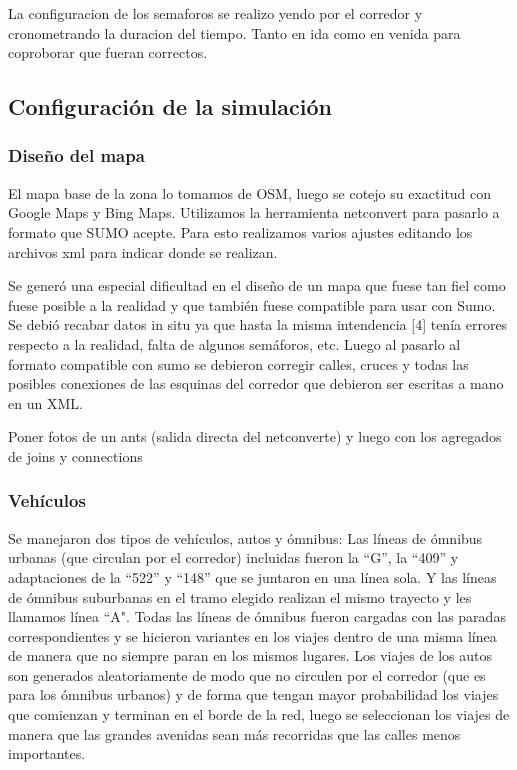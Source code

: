 La configuracion de los semaforos se realizo yendo por el corredor y cronometrando la duracion del tiempo. Tanto en ida como en venida para coproborar que fueran correctos.



\subsection{Configuración de la simulación}

\subsubsection{Diseño del mapa}
El mapa base de la zona lo tomamos de OSM, luego se cotejo su exactitud con Google Maps y Bing Maps.
Utilizamos la herramienta netconvert para pasarlo a formato que SUMO acepte. 
Para esto realizamos varios ajustes editando los archivos xml para indicar donde se realizan.

Se generó una especial dificultad en el diseño de un mapa que
fuese tan fiel como fuese posible a la realidad y que también
fuese compatible para usar con  Sumo. Se debió recabar datos
in  situ  ya  que  hasta  la  misma  intendencia  [4]  tenía  errores
respecto a la realidad, falta de algunos semáforos, etc. Luego al
pasarlo  al  formato  compatible  con  sumo  se  debieron  corregir
calles,  cruces  y  todas las  posibles  conexiones de  las  esquinas
del corredor que debieron ser escritas a mano en un XML.

Poner fotos de un ants (salida directa del netconverte) y luego con los agregados de joins y connections


\subsubsection{Vehículos}
Se manejaron dos tipos de vehículos, autos y ómnibus:
Las  líneas  de  ómnibus  urbanas  (que  circulan  por  el
corredor)  incluidas  fueron  la  “G”,  la  “409”  y
adaptaciones  de  la  “522”  y  “148”  que  se  juntaron  en
una  línea  sola. Y  las líneas de ómnibus suburbanas en
el  tramo  elegido  realizan  el  mismo  trayecto  y  les
llamamos  línea  “A".  Todas  las  líneas  de  ómnibus
fueron cargadas con las paradas correspondientes y se
hicieron  variantes  en  los  viajes  dentro  de  una  misma
línea de manera que no siempre paran en los mismos
lugares.
Los  viajes  de  los  autos  son  generados  aleatoriamente
de modo que no circulen por el corredor (que es para
los  ómnibus  urbanos)  y  de  forma  que  tengan  mayor
probabilidad los viajes que comienzan y terminan en el
borde  de  la  red,  luego  se  seleccionan  los  viajes  de
manera  que  las  grandes  avenidas  sean  más  recorridas
que  las  calles  menos  importantes.

